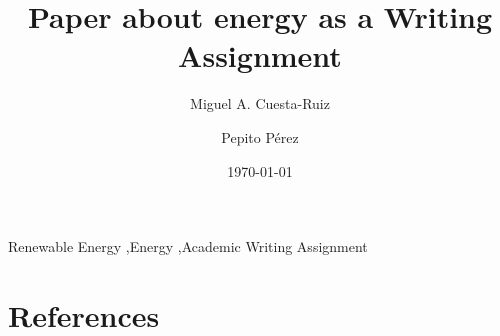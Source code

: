 \documentclass[review]{elsarticle} %
\date{\today}
\begin{document}
\begin{frontmatter}

\title{Paper about energy as a Writing Assignment}

\author[label1,label2]{Miguel A. Cuesta-Ruiz}
\author[label1]{Pepito P\'erez}
\address[label1]{DeustoTech - Fundaci\'on Deusto, Avda Universidades, 24, 48007, Bilbao. }
\address[label2]{Facultad Ingenier\'\i{}a, Universidad de Deusto, Avda. Universidades, 24, 48007, Bilbao.}


\begin{keyword}
Renewable Energy \sep Energy \sep Academic Writing Assignment
\end{keyword}

\end{frontmatter}



\section*{References}

\end{document}
